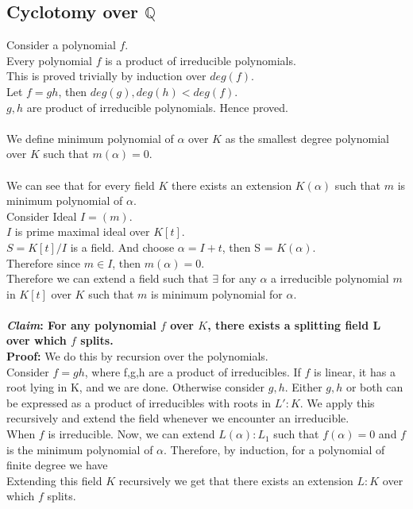 \documentclass{article}
\begin{document}
\subsection{Cyclotomy over $\mathbb{Q}$}
Consider a polynomial $f$. \\
Every polynomial $f$ is a product of irreducible polynomials. \\
This is proved trivially by induction over $deg(f)$. \\
Let $f = gh$, then $deg(g), deg(h) < deg(f)$. \\
$g,h$ are product of irreducible polynomials. Hence proved. 
\\ \\
We define minimum polynomial of $\alpha$ over $K$ as the smallest degree polynomial over $K$ such that $m(\alpha) = 0$. \\ \\
We can see that for every field $K$ there exists an extension $K(\alpha)$ such that $m$ is minimum polynomial of $\alpha$. \\
Consider Ideal $I = (m)$.
\\ $I$ is prime maximal ideal over $K[t]$. \\
$S = K[t]/I$ is a field. And choose $\alpha = I + t$, then S = $K(\alpha)$. \\
Therefore since $m \in I$, then $m(\alpha) = 0$. \\
Therefore we can extend a field such that $\exists$ for any $\alpha$ a irreducible polynomial $m$ in $K[t]$ over $K$ such that $m$ is minimum polynomial for $\alpha$.  \\ \\
\textbf{\textit{Claim}: For any polynomial $f$ over $K$, there exists a splitting field L over which $f$ splits. } \\
\textbf{Proof:} We do this by recursion over the polynomials. \\
Consider $f = gh$, where f,g,h are a product of irreducibles. If $f$ is linear, it has a root lying in K, and we are done. Otherwise consider $g,h$. Either $g,h$ or both can be expressed as a product of irreducibles with roots in $L':K$. We apply this recursively and extend the field whenever we encounter an irreducible. \\
When $f$ is irreducible. Now, we can extend $L(\alpha):L_1$ such that $f(\alpha)=0$ and $f$ is the minimum polynomial of $\alpha$. Therefore, by induction, for a polynomial of finite degree we have  \\
Extending this field $K$ recursively we get that there exists an extension $L:K$ over which $f$ splits. \\ \\
\end{document}
